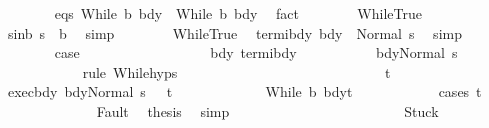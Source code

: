 \begin{isabellebody}
\ \ \ \ \ \ \isamarkupfalse%
\ eqs{\isacharcolon}\ {\isachardoublequoteopen}While\ b{\isacharprime}\ bdy{}{\isacharprime}\ {\isacharequal}\ While\ b\ bdy{}{\isachardoublequoteclose}\ \isamarkupfalse%
\ fact\isanewline
\ \ \ \ \ \ \isamarkupfalse%
\ WhileTrue\ \isamarkupfalse%
\ s{\isacharunderscore}in{\isacharunderscore}b{\isacharcolon}\ {\isachardoublequoteopen}s\ {\isasymin}\ b{\isachardoublequoteclose}\ \isamarkupfalse%
\ simp\isanewline
\ \ \ \ \ \ \isamarkupfalse%
\ WhileTrue\ \isamarkupfalse%
\ termi{\isacharunderscore}bdy{}{\isacharcolon}\ {\isachardoublequoteopen}{\isasymGamma}{\isasymturnstile}bdy{}\ {\isasymdown}\ Normal\ s{\isachardoublequoteclose}\ \isamarkupfalse%
\ simp\isanewline
\ \ \ \ \ \ \isamarkupfalse%
\ {\isacharquery}case\isanewline
\ \ \ \ \ \ \isamarkupfalse%
\ {\isacharminus}\isanewline
\ \ \ \ \ \ \ \ \isamarkupfalse%
\ bdy\ termi{\isacharunderscore}bdy{}\ \isanewline
\ \ \ \ \ \ \ \ \isamarkupfalse%
\ {\isachardoublequoteopen}{\isasymGamma}{\isasymturnstile}bdy{\isasymdown}{\isacharparenleft}Normal\ s{\isacharparenright}{\isachardoublequoteclose}\isanewline
\ \ \ \ \ \ \ \ \ \ \isamarkupfalse%
\ {\isacharparenleft}rule\ While{\isachardot}hyps{\isacharparenright}\isanewline
\ \ \ \ \ \ \ \ \isamarkupfalse%
\isanewline
\ \ \ \ \ \ \ \ \isacommand{{\isacharbraceleft}}\isamarkupfalse%
\isanewline
\ \ \ \ \ \ \ \ \ \ \isamarkupfalse%
\ t\isanewline
\ \ \ \ \ \ \ \ \ \ \isamarkupfalse%
\ exec{\isacharunderscore}bdy{\isacharcolon}\ {\isachardoublequoteopen}{\isasymGamma}{\isasymturnstile}{\isasymlangle}bdy{\isacharcomma}Normal\ s\ {\isasymrangle}\ {\isasymRightarrow}\ t{\isachardoublequoteclose}\ \isanewline
\ \ \ \ \ \ \ \ \ \ \isamarkupfalse%
\ {\isachardoublequoteopen}{\isasymGamma}{\isasymturnstile}While\ b\ bdy{\isasymdown}t{\isachardoublequoteclose}\isanewline
\ \ \ \ \ \ \ \ \ \ \isamarkupfalse%
\ {\isacharparenleft}cases\ t{\isacharparenright}\isanewline
\ \ \ \ \ \ \ \ \ \ \ \ \isamarkupfalse%
\ Fault\ \isamarkupfalse%
\ {\isacharquery}thesis\ \isamarkupfalse%
\ simp\isanewline
\ \ \ \ \ \ \ \ \ \ \isamarkupfalse%
\isanewline
\ \ \ \ \ \ \ \ \ \ \ \ \isamarkupfalse%
\ Stuck\ \isamarkupfalse%

\end{isabellebody}
